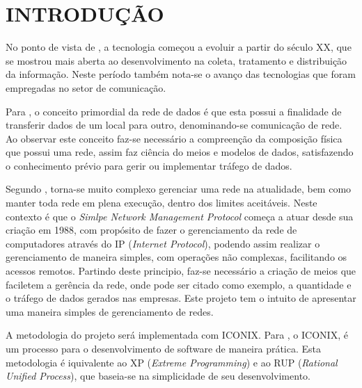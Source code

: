 \chapter{INTRODUÇÃO}

\par No ponto de vista de , a tecnologia começou a evoluir a
partir do século XX, que se mostrou mais aberta ao desenvolvimento na coleta, tratamento e distribuição
da informação. Neste período também nota-se o avanço das tecnologias que foram empregadas
no setor de comunicação.

\par Para , o conceito primordial da rede de dados é que esta
possui a finalidade de transferir dados de um local para outro, denominando-se comunicação de rede. Ao
observar este conceito faz-se necessário a compreenção da composição física que possui uma
rede, assim faz ciência do meios e modelos de dados, satisfazendo o conhecimento prévio para
gerir ou implementar tráfego de dados.

\par Segundo , torna-se muito complexo
gerenciar uma rede na atualidade, bem como manter toda rede em plena execução, dentro dos limites aceitáveis. Neste
contexto é que o \textit{Simlpe Network Management Protocol} começa a atuar
desde sua criação em 1988, com propósito de fazer o gerenciamento da rede de
computadores através do IP (\textit{Internet Protocol}), podendo assim realizar
o gerenciamento de maneira simples, com operações não complexas, facilitando os acessos remotos.
Partindo deste principio, faz-se necessário a criação de meios que faciletem a gerência da rede,
 onde pode ser citado como exemplo, a quantidade e o tráfego de dados gerados nas
empresas. Este projeto tem o intuito de apresentar uma maneira simples de gerenciamento de
redes.

\par A metodologia do projeto será implementada com ICONIX. Para ,
 o ICONIX, é um processo para o desenvolvimento de software de maneira prática. Esta metodologia
é iquivalente ao XP (\textit{Extreme Programming}) e ao RUP (\textit{Rational Unified
Process}), que baseia-se na simplicidade de seu desenvolvimento.
